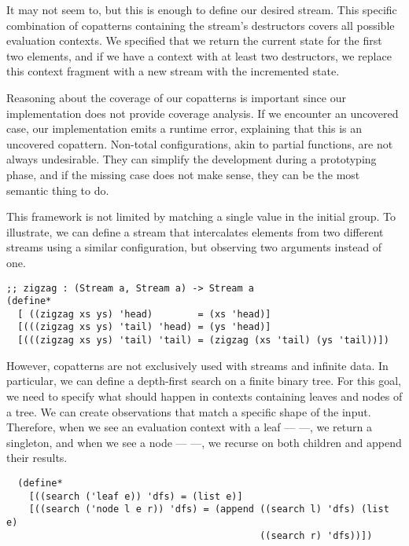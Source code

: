 It may not seem to, but this is enough to define our desired stream.
This specific combination of copatterns containing the stream's destructors covers all possible evaluation contexts.
We specified that we return the current state for the first two elements, and if we have a context with at least two  destructors, we replace this context fragment with a new stream with the incremented state.   

Reasoning about the coverage of our copatterns is important since our implementation does not provide coverage analysis.
If we encounter an uncovered case, our implementation emits a runtime error, explaining that this is an uncovered copattern.
Non-total configurations, akin to partial functions, are not always undesirable. They can simplify the development during a prototyping phase, and if the missing case does not make sense, they can be the most semantic thing to do.

This framework is not limited by matching a single value in the initial group.
To illustrate, we can define a stream that intercalates elements from two different streams using a similar configuration, but observing two arguments instead of one.


\begin{verbatim}
;; zigzag : (Stream a, Stream a) -> Stream a
(define*
  [ ((zigzag xs ys) 'head)        = (xs 'head)]
  [(((zigzag xs ys) 'tail) 'head) = (ys 'head)]
  [(((zigzag xs ys) 'tail) 'tail) = (zigzag (xs 'tail) (ys 'tail))])
\end{verbatim}

However, copatterns are not exclusively used with streams and infinite data.
In particular, we can define a depth-first search on a finite binary tree.
For this goal, we need to specify what should happen in contexts containing leaves and nodes of a tree.
We can create observations that match a specific shape of the input.
Therefore, when we see an evaluation context with a leaf ---  ---, we return a singleton, and when we see a node ---  ---, we recurse on both children and append their results.

\begin{verbatim}
  (define*
    [((search ('leaf e)) 'dfs) = (list e)]
    [((search ('node l e r)) 'dfs) = (append ((search l) 'dfs) (list e)
                                             ((search r) 'dfs))])
  \end{verbatim}


